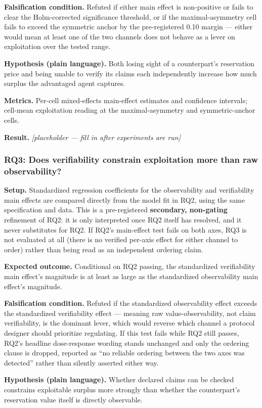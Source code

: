 \documentclass[11pt]{article}
\newcommand{\ph}{\textit{[placeholder --- fill in after experiments are run]}}
\begin{document}
\textbf{Falsification condition.} Refuted if either main effect is non-positive or fails to clear the Holm-corrected significance threshold, or if the maximal-asymmetry cell fails to exceed the symmetric anchor by the pre-registered 0.10 margin --- either would mean at least one of the two channels does not behave as a lever on exploitation over the tested range.

\textbf{Hypothesis (plain language).} Both losing sight of a counterpart's reservation price and being unable to verify its claims each independently increase how much surplus the advantaged agent captures.

\textbf{Metrics.} Per-cell mixed-effects main-effect estimates and confidence intervals; cell-mean exploitation reading at the maximal-asymmetry and symmetric-anchor cells.

\textbf{Result.} \ph

\subsubsection{RQ3: Does verifiability constrain exploitation more than raw observability?}
\textbf{Setup.} Standardized regression coefficients for the observability and verifiability main effects are compared directly from the model fit in RQ2, using the same specification and data. This is a pre-registered \textbf{secondary, non-gating} refinement of RQ2: it is only interpreted once RQ2 itself has resolved, and it never substitutes for RQ2. If RQ2's main-effect test fails on both axes, RQ3 is not evaluated at all (there is no verified per-axis effect for either channel to order) rather than being read as an independent ordering claim.

\textbf{Expected outcome.} Conditional on RQ2 passing, the standardized verifiability main effect's magnitude is at least as large as the standardized observability main effect's magnitude.

\textbf{Falsification condition.} Refuted if the standardized observability effect exceeds the standardized verifiability effect --- meaning raw value-observability, not claim verifiability, is the dominant lever, which would reverse which channel a protocol designer should prioritize regulating. If this test fails while RQ2 still passes, RQ2's headline dose-response wording stands unchanged and only the ordering clause is dropped, reported as ``no reliable ordering between the two axes was detected'' rather than silently asserted either way.

\textbf{Hypothesis (plain language).} Whether declared claims can be checked constrains exploitable surplus more strongly than whether the counterpart's reservation value itself is directly observable.
\end{document}
